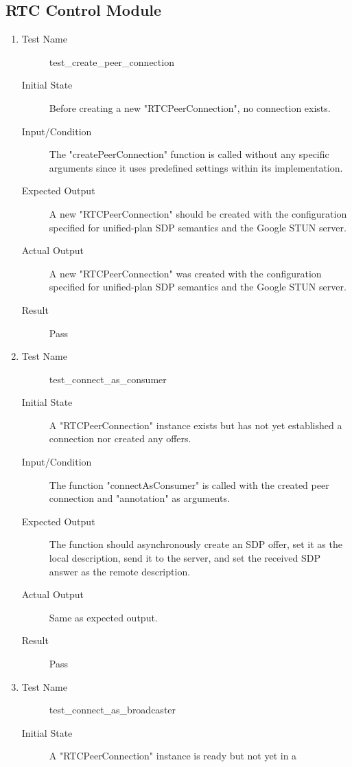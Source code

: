 \documentclass[12pt, titlepage]{article}
\begin{document}
\subsection{RTC Control Module}
\begin{enumerate}[UT-RC1]
\item \label{UT-RC1}
  \begin{description}
  \item[Test Name] test\_create\_peer\_connection
  \item[Initial State] Before creating a new "RTCPeerConnection", no connection
    exists.
  \item[Input/Condition] The "createPeerConnection" function is called without
    any specific arguments since it uses predefined settings within its
    implementation.
  \item[Expected Output] A new "RTCPeerConnection" should be created with the
    configuration specified for unified-plan SDP semantics and the Google STUN
    server.
  \item[Actual Output] A new "RTCPeerConnection" was created with the
    configuration specified for unified-plan SDP semantics and the Google STUN
    server.
  \item[Result] Pass
  \end{description}
\item \label{UT-RC2}
  \begin{description}
  \item[Test Name] test\_connect\_as\_consumer
  \item[Initial State] A "RTCPeerConnection" instance exists but has not yet
    established a connection nor created any offers.
  \item[Input/Condition] The function "connectAsConsumer" is called with the
    created peer connection and "annotation" as arguments.
  \item[Expected Output] The function should asynchronously create an SDP offer,
    set it as the local description, send it to the server, and set the received
    SDP answer as the remote description.
  \item[Actual Output] Same as expected output.
  \item[Result] Pass
  \end{description}
\item \label{UT-RC3}
  \begin{description}
  \item[Test Name] test\_connect\_as\_broadcaster
  \item[Initial State] A "RTCPeerConnection" instance is ready but not yet in a

\end{description}
\end{enumerate}
\end{document}

